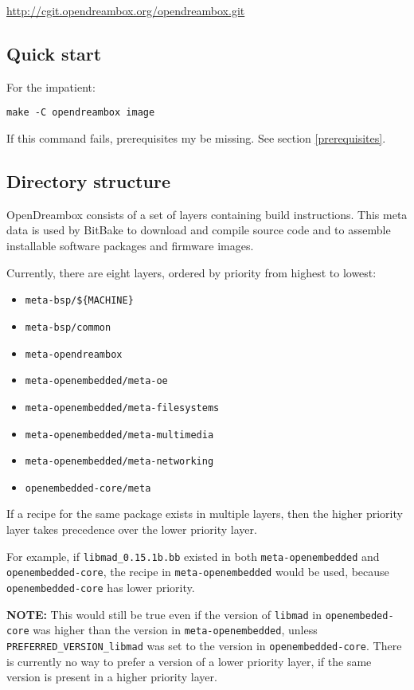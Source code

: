 \documentclass[a4paper]{article}
\newcommand{\shell}[1]{\texttt{\small #1}}
\begin{document}
    \url{http://cgit.opendreambox.org/opendreambox.git}

  \subsection{Quick start}
    For the impatient:

    \shell{make -C opendreambox image}

    If this command fails, prerequisites my be missing. See section \ref{prerequisites}.

  \subsection{Directory structure}
    OpenDreambox consists of a set of layers containing build instructions.
    This meta data is used by BitBake to download and compile source code
    and to assemble installable software packages and firmware images.

    Currently, there are eight layers, ordered by priority from highest to
    lowest:

    \begin{itemize}
      \item \shell{meta-bsp/\$\{MACHINE\}}
      \item \shell{meta-bsp/common}
      \item \shell{meta-opendreambox}
      \item \shell{meta-openembedded/meta-oe}
      \item \shell{meta-openembedded/meta-filesystems}
      \item \shell{meta-openembedded/meta-multimedia}
      \item \shell{meta-openembedded/meta-networking}
      \item \shell{openembedded-core/meta}
    \end{itemize}

    If a recipe for the same package exists in multiple layers,
    then the higher priority layer takes precedence over the lower priority
    layer.

    For example, if \shell{libmad\_0.15.1b.bb} existed in both
    \shell{meta-openembedded} and \shell{openembedded-core}, the recipe in
    \shell{meta-openembedded} would be used, because \shell{openembedded-core}
    has lower priority.

    \textbf{NOTE:} This would still be true even if the version of \shell{libmad} in
    \shell{openembeded-core} was higher than the version in \shell{meta-openembedded},
    unless \shell{PREFERRED\_VERSION\_libmad} was set to the version in \shell{openembedded-core}.
    There is currently no way to prefer a version of a lower priority layer, if the
    same version is present in a higher priority layer.
\end{document}
